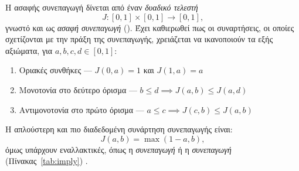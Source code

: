 Η ασαφής συνεπαγωγή δίνεται από έναν \textit{δυαδικό τελεστή}
\[
J : [0,1]\times[0,1] \to [0,1],
\]
γνωστό και ως \textit{ασαφή συνεπαγωγή} (\textit{}).
Έχει καθιερωθεί πως οι συναρτήσεις, οι οποίες σχετίζονται με την πράξη της συνεπαγωγής, χρειάζεται να ικανοποιούν τα εξής αξιώματα, για \(a,b,c,d \in [0,1]\):
\begin{enumerate}[label=(\textbf{\en{I}\arabic*)}, align=left, leftmargin=1em]
    \item Οριακές συνθήκες --- \(J(0,a) = 1\) και \(J(1,a) = a\)
    \item Μονοτονία στο δεύτερο όρισμα --- \(b \leq d \implies J(a,b) \leq J(a,d)\)
    \item Αντιμονοτονία στο πρώτο όρισμα --- \(a \leq c \implies J(c,b) \leq J(a,b)\)
\end{enumerate}

Η απλούστερη και πιο διαδεδομένη συνάρτηση συνεπαγωγής είναι:
\begin{equation}
    J(a,b) = \max(1-a,b),
\end{equation}
όμως υπάρχουν εναλλακτικές, όπως η \textit{συνεπαγωγή } ή η \textit{συνεπαγωγή } (Πίνακας~\ref{tab:imply}) \cite{Zadeh1965,KlirYuan,Ross2010}.

